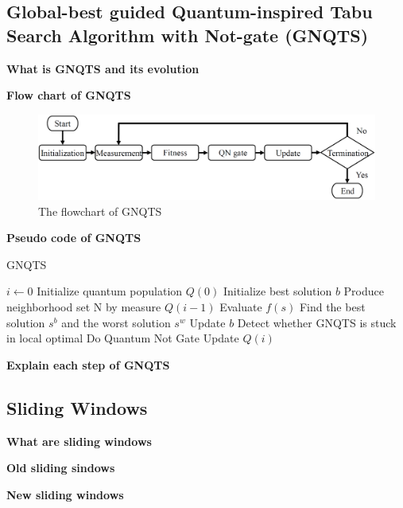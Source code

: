 \documentclass[../main.tex]{subfiles}
\begin{document}
\subsection{Global-best guided Quantum-inspired Tabu Search Algorithm with Not-gate (GNQTS)}
\textbf{What is GNQTS and its evolution}

\textbf{Flow chart of GNQTS}

\begin{figure}
    \centering
    \includegraphics[scale = 0.5] {figure/flowChart.png}
    \caption{The flowchart of GNQTS}
    \label{flow}
\end{figure}

\textbf{Pseudo code of GNQTS}

\begin{algorithm}
    \caption{GNQTS}
    \begin{algorithmic}[1]
        \State $i \leftarrow 0$
        \State Initialize quantum  population $Q(0)$
        \State Initialize best solution $b$
        \State Produce neighborhood set N by measure $Q(i-1)$
        \State Evaluate $f(s)$
        \State Find the best solution $s^b$ and the worst solution $s^w$
        \State Update $b$
        \State Detect whether GNQTS is stuck in local optimal
        \State Do Quantum Not Gate
        \EndIf
        \State Update $Q(i)$
        \EndWhile
    \end{algorithmic}
\end{algorithm}
\bigbreak
\textbf{Explain each step of GNQTS}

\subsection{Sliding Windows}
\textbf{What are sliding windows}

\textbf{Old sliding sindows}

\textbf{New sliding windows}
\end{document}
